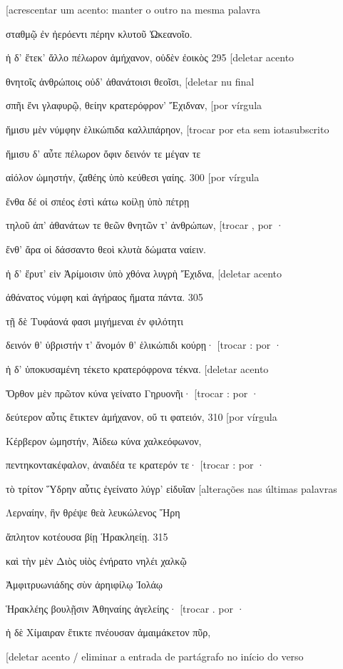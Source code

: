 {[}acrescentar um acento: manter o outro na mesma palavra

σταθμῷ ἐν ἠερόεντι πέρην κλυτοῦ Ὠκεανοῖο.

ἡ δ' ἔτεκ' ἄλλο πέλωρον ἀμήχανον, οὐδὲν ἐοικὸς 295 {[}deletar acento

θνητοῖς ἀνθρώποις οὐδ' ἀθανάτοισι θεοῖσι, {[}deletar nu final

σπῆι ἔνι γλαφυρῷ, θείην κρατερόφρον' Ἔχιδναν, {[}por vírgula

ἥμισυ μὲν νύμφην ἑλικώπιδα καλλιπάρηον, {[}trocar por eta sem
iotasubscrito

ἥμισυ δ' αὖτε πέλωρον ὄφιν δεινόν τε μέγαν τε

αἰόλον ὠμηστήν, ζαθέης ὑπὸ κεύθεσι γαίης. 300 {[}por vírgula

ἔνθα δέ οἱ σπέος ἐστὶ κάτω κοίλῃ ὑπὸ πέτρῃ

τηλοῦ ἀπ' ἀθανάτων τε θεῶν θνητῶν τ' ἀνθρώπων, {[}trocar , por ·

ἔνθ' ἄρα οἱ δάσσαντο θεοὶ κλυτὰ δώματα ναίειν.

ἡ δ' ἔρυτ' εἰν Ἀρίμοισιν ὑπὸ χθόνα λυγρὴ Ἔχιδνα, {[}deletar acento

ἀθάνατος νύμφη καὶ ἀγήραος ἤματα πάντα. 305

τῇ δὲ Τυφάονά φασι μιγήμεναι ἐν φιλότητι

δεινόν θ' ὑβριστήν τ' ἄνομόν θ' ἑλικώπιδι κούρῃ· {[}trocar : por ·

ἡ δ' ὑποκυσαμένη τέκετο κρατερόφρονα τέκνα. {[}deletar acento

Ὄρθον μὲν πρῶτον κύνα γείνατο Γηρυονῆι· {[}trocar : por ·

δεύτερον αὖτις ἔτικτεν ἀμήχανον, οὔ τι φατειόν, 310 {[}por vírgula

Κέρβερον ὠμηστήν, Ἀίδεω κύνα χαλκεόφωνον,

πεντηκοντακέφαλον, ἀναιδέα τε κρατερόν τε· {[}trocar : por ·

τὸ τρίτον Ὕδρην αὖτις ἐγείνατο λύγρ' εἰδυῖαν {[}alterações nas últimas
palavras

Λερναίην, ἣν θρέψε θεὰ λευκώλενος Ἥρη

ἄπλητον κοτέουσα βίῃ Ἡρακληείῃ. 315

καὶ τὴν μὲν Διὸς υἱὸς ἐνήρατο νηλέι χαλκῷ

Ἀμφιτρυωνιάδης σὺν ἀρηιφίλῳ Ἰολάῳ

Ἡρακλέης βουλῇσιν Ἀθηναίης ἀγελείης· {[}trocar . por ·

ἡ δὲ Χίμαιραν ἔτικτε πνέουσαν ἀμαιμάκετον πῦρ,

{[}deletar acento / eliminar a entrada de partágrafo no início do verso

